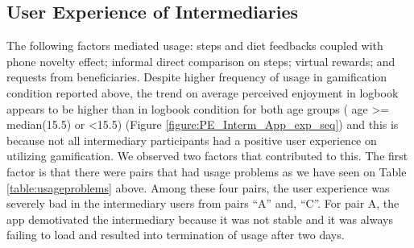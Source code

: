 \documentclass{sig-alternate}
\begin{document}
\subsection{User Experience of Intermediaries}
The following factors mediated usage: steps and diet feedbacks coupled with phone novelty effect; informal direct comparison on steps; virtual rewards; and requests from beneficiaries.\newline
Despite higher frequency of usage in gamification condition reported above, the trend on average perceived enjoyment in logbook appears to be higher than in logbook condition for both age groups ( age \textgreater = median(15.5) or \textless 15.5) (Figure \ref{figure:PE_Interm_App_exp_seq}) and this is because not all intermediary participants had a positive user experience on utilizing gamification. We observed two factors that contributed  to this. The first factor is that there were pairs that had usage problems as we have seen on Table \ref{table:usageproblems} above. Among these four pairs, the user experience was severely bad in the intermediary users from pairs ``A'' and, ``C''.\newline
For pair A, the app demotivated the intermediary because it was not stable  and it was always failing to load and resulted into termination of usage after two days.\newline
\end{document}
